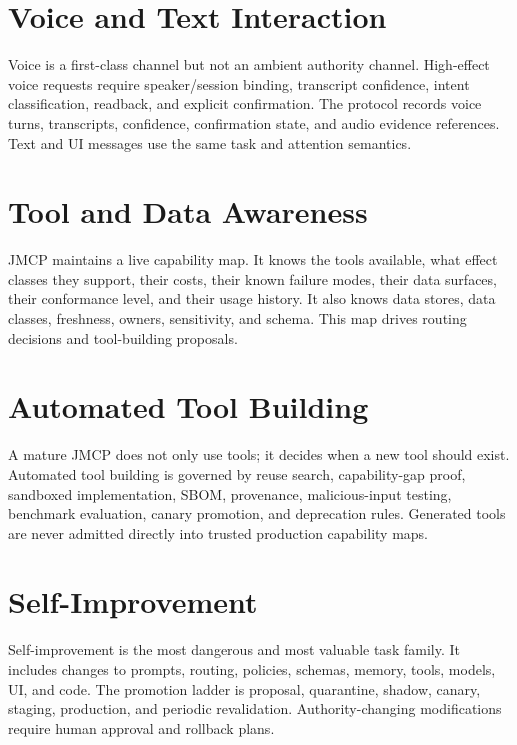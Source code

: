 \documentclass[10pt,journal,onecolumn]{IEEEtran}
\begin{document}
\section{Voice and Text Interaction}
Voice is a first-class channel but not an ambient authority channel. High-effect voice requests require speaker/session binding, transcript confidence, intent classification, readback, and explicit confirmation. The protocol records voice turns, transcripts, confidence, confirmation state, and audio evidence references. Text and UI messages use the same task and attention semantics.

\section{Tool and Data Awareness}
JMCP maintains a live capability map. It knows the tools available, what effect classes they support, their costs, their known failure modes, their data surfaces, their conformance level, and their usage history. It also knows data stores, data classes, freshness, owners, sensitivity, and schema. This map drives routing decisions and tool-building proposals.

\section{Automated Tool Building}
A mature JMCP does not only use tools; it decides when a new tool should exist. Automated tool building is governed by reuse search, capability-gap proof, sandboxed implementation, SBOM, provenance, malicious-input testing, benchmark evaluation, canary promotion, and deprecation rules. Generated tools are never admitted directly into trusted production capability maps.

\section{Self-Improvement}
Self-improvement is the most dangerous and most valuable task family. It includes changes to prompts, routing, policies, schemas, memory, tools, models, UI, and code. The promotion ladder is proposal, quarantine, shadow, canary, staging, production, and periodic revalidation. Authority-changing modifications require human approval and rollback plans.
\end{document}
